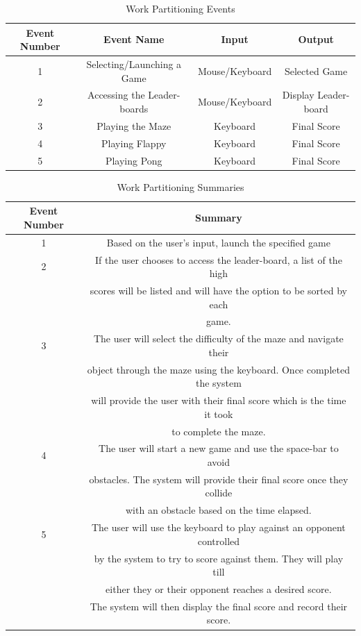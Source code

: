 \documentclass[12pt, titlepage]{article}
\begin{document}
\begin{table}[H]
\caption{Work Partitioning Events}
\begin{center}
\begin{tabular}{|c|c|c|c|}
\hline
Event Number & Event Name & Input & Output \\
\hline
1 & Selecting/Launching a Game & Mouse/Keyboard & Selected Game \\
\hline
2 & Accessing the Leader-boards & Mouse/Keyboard & Display Leader-board\\
\hline
3 & Playing the Maze & Keyboard & Final Score\\
\hline
4 & Playing Flappy & Keyboard & Final Score\\
\hline
5 & Playing Pong & Keyboard & Final Score\\
\hline
\end{tabular}
\end{center}
\label{default}
\end{table}%

\begin{table}[H]
\caption{Work Partitioning Summaries}
\begin{center}
\begin{tabular}{|c|c|}
\hline
Event Number & Summary\\
\hline
1 & Based on the user’s input, launch the specified game\\
\hline
2 & If the user chooses to access the leader-board, a list of the high\\ &scores will be listed and will have the option to be sorted by each\\ &game.\\
\hline
3 & The user will select the difficulty of the maze and navigate their\\ &object through the maze using the keyboard. Once completed the system\\ &will provide the user with their final score which is the time it took\\ &to complete the maze.\\
\hline
4 & The user will start a new game and use the space-bar to avoid\\ &obstacles. The system will provide their final score once they collide\\ &with an obstacle based on the time elapsed.\\
\hline
5 & The user will use the keyboard to play against an opponent controlled\\ &by the system to try to score against them. They will play till\\ &either they or their opponent reaches a desired score. \\&The system will then display the final score and record their score.\\
\hline
\end{tabular}
\end{center}
\label{default}
\end{table}%
\end{document}
